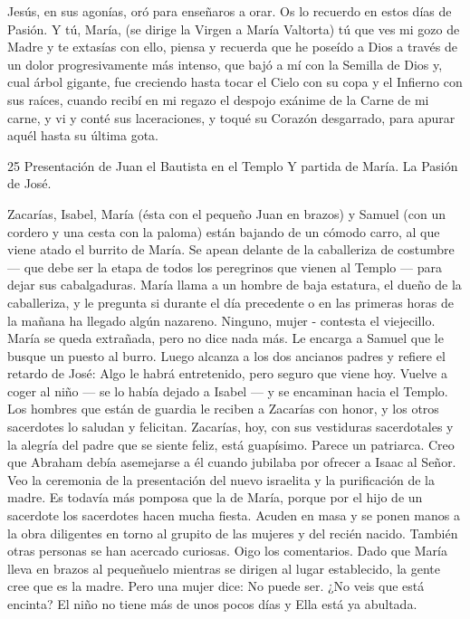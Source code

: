 \documentclass[12pt]{book} %
\begin{document}
Jesús, en sus agonías, oró para enseñaros a orar. Os lo recuerdo en estos días de Pasión.                  
Y tú, María, (se dirige la Virgen a María Valtorta) tú que ves mi gozo de Madre y te extasías con ello, piensa y recuerda que he poseído a Dios a través de un dolor progresivamente más intenso, que bajó a mí con la Semilla de Dios y, cual árbol gigante, fue creciendo hasta tocar el Cielo con su copa y el Infierno con sus raíces, cuando recibí en mi regazo el despojo exánime de la Carne de mi carne, y vi y conté sus laceraciones, y toqué su Corazón desgarrado, para apurar aquél hasta su última gota. 
 
 
25 
 Presentación de Juan el Bautista en el Templo Y partida de María. La Pasión de José. 
 
Zacarías, Isabel, María (ésta con el pequeño Juan en brazos) y Samuel (con un cordero y una cesta con la paloma) están bajando de un cómodo carro, al que viene atado el burrito de María. Se apean delante de la caballeriza de costumbre — que debe ser la etapa de todos los peregrinos que vienen al Templo — para dejar sus cabalgaduras. 
María llama a un hombre de baja estatura, el dueño de la caballeriza, y le pregunta si durante el día precedente o en las 
primeras horas de la mañana ha llegado algún nazareno. 
Ninguno, mujer - contesta el viejecillo. 
María se queda extrañada, pero no dice nada más. 
Le encarga a Samuel que le busque un puesto al burro. Luego alcanza a los dos ancianos padres y refiere el retardo de José: 
Algo le habrá entretenido, pero seguro que viene hoy. 
Vuelve a coger al niño — se lo había dejado a Isabel — y se encaminan hacia el Templo. 
Los hombres que están de guardia le reciben a Zacarías con honor, y los otros sacerdotes lo saludan y felicitan. Zacarías, 
hoy, con sus vestiduras sacerdotales y la alegría del padre que se siente feliz, está guapísimo. Parece un patriarca. Creo que Abraham debía asemejarse a él cuando jubilaba por ofrecer a Isaac al Señor. 
Veo la ceremonia de la presentación del nuevo israelita y la purificación de la madre. Es todavía más pomposa que la de María, porque por el hijo de un sacerdote los sacerdotes hacen mucha fiesta. Acuden en masa y se ponen manos a la obra diligentes en torno al grupito de las mujeres y del recién nacido. 
También otras personas se han acercado curiosas. Oigo los comentarios. Dado que María lleva en brazos al pequeñuelo 
mientras se dirigen al lugar establecido, la gente cree que es la madre. 
Pero una mujer dice: 
No puede ser. ¿No veis que está encinta? El niño no tiene más de unos pocos días y Ella está ya abultada. 
\end{document}
